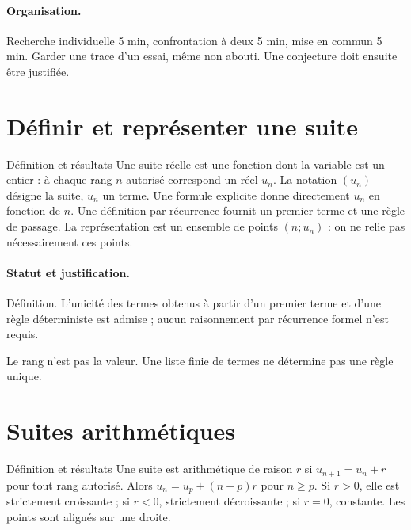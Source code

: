 \paragraph{Organisation.} Recherche individuelle 5 min, confrontation à deux 5 min, mise en commun 5 min. Garder une trace d’un essai, même non abouti. Une conjecture doit ensuite être justifiée.
\section{Définir et représenter une suite}\label{C01-U1}
\begin{repere}{Définition et résultats}
Une suite réelle est une fonction dont la variable est un entier : à chaque rang $n$ autorisé correspond un réel $u_n$. La notation $(u_n)$ désigne la suite, $u_n$ un terme. Une formule explicite donne directement $u_n$ en fonction de $n$. Une définition par récurrence fournit un premier terme et une règle de passage. La représentation est un ensemble de points $(n;u_n)$ : on ne relie pas nécessairement ces points.
\end{repere}
\paragraph{Statut et justification.} Définition. L’unicité des termes obtenus à partir d’un premier terme et d’une règle déterministe est admise ; aucun raisonnement par récurrence formel n’est requis.
\label{C01-EX1}

\begin{erreur}Le rang n’est pas la valeur. Une liste finie de termes ne détermine pas une règle unique.\end{erreur}
\label{C01-AP1}
\section{Suites arithmétiques}\label{C01-U2}
\begin{repere}{Définition et résultats}
Une suite est arithmétique de raison $r$ si $u_{n+1}=u_n+r$ pour tout rang autorisé. Alors $u_n=u_p+(n-p)r$ pour $n\geq p$. Si $r>0$, elle est strictement croissante ; si $r<0$, strictement décroissante ; si $r=0$, constante. Les points sont alignés sur une droite.
\end{repere}
